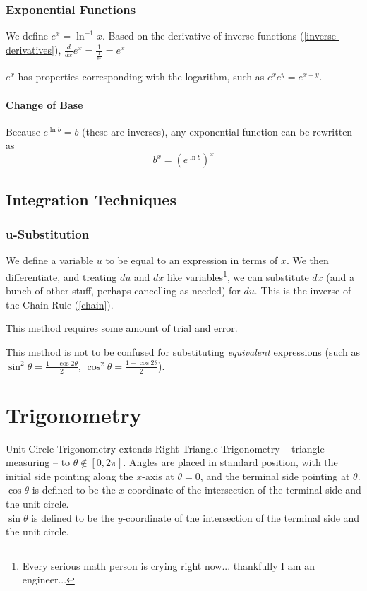 \documentclass{article}
\begin{document}
\subsubsection{Exponential Functions}
We define $e^x=\ln^{-1}x$. Based on the derivative of inverse functions (\ref{inverse-derivatives}), $\frac{d}{dx}e^x=\frac{1}{\frac{1}{e^x}}=e^x$

$e^x$ has properties corresponding with the logarithm, such as $e^xe^y=e^{x+y}$.

\paragraph{Change of Base}
Because $e^{\ln{b}}=b$ (these are inverses), any exponential function can be rewritten as
$$b^x=\left(e^{\ln{b}}\right)^x$$

\subsection{Integration Techniques}
\subsubsection{u-Substitution}
We define a variable $u$ to be equal to an expression in terms of $x$. We then differentiate, and treating $du$ and $dx$ like variables\footnote{Every serious math person is crying right now... thankfully I am an engineer...}, we can substitute $dx$ (and a bunch of other stuff, perhaps cancelling as needed) for $du$.
This is the inverse of the Chain Rule (\ref{chain}).

This method requires some amount of trial and error.

This method is not to be confused for substituting \emph{equivalent} expressions (such as $\sin^2{\theta} = \frac{1-\cos{2\theta}}{2}$, $\cos^2{\theta} = \frac{1+\cos{2\theta}}{2}$).

\section{Trigonometry}
Unit Circle Trigonometry extends Right-Triangle Trigonometry -- triangle measuring -- to $\theta \notin [0, 2\pi]$.
Angles are placed in standard position, with the initial side pointing along the $x$-axis at $\theta=0$, and the terminal side pointing at $\theta$.\\
$\cos{\theta}$ is defined to be the $x$-coordinate of the intersection of the terminal side and the unit circle.\\
$\sin{\theta}$ is defined to be the $y$-coordinate of the intersection of the terminal side and the unit circle.\\
\end{document}

